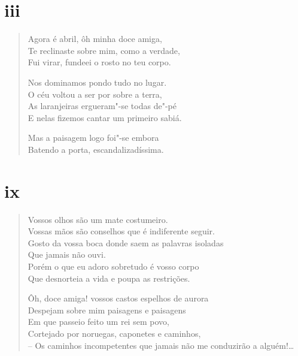 {%
\pagebreak
\section*{iii}

\begin{verse}
Agora é abril, ôh minha doce amiga,\\
Te reclinaste sobre mim, como a verdade,\\
Fui virar, fundeei o rosto no teu corpo.

Nos dominamos pondo tudo no lugar.\\
O céu voltou a ser por sobre a terra,\\
As laranjeiras ergueram"-se todas de"-pé\\
E nelas fizemos cantar um primeiro sabiá.

Mas a paisagem logo foi"-se embora\\
Batendo a porta, escandalizadíssima.
\end{verse}

\pagebreak
\section*{ix}

\begin{verse}
Vossos olhos são um mate costumeiro.\\
Vossas mãos são conselhos que é indiferente seguir.\\
Gosto da vossa boca donde saem as palavras isoladas\\
Que jamais não ouvi.\\
Porém o que eu adoro sobretudo é vosso corpo\\
Que desnorteia a vida e poupa as restrições.

Ôh, doce amiga! vossos castos espelhos de aurora\\
Despejam sobre mim paisagens e paisagens\\
Em que passeio feito um rei sem povo,\\
Cortejado por noruegas, caponetes e caminhos,\\
-- Os caminhos incompetentes que jamais não me conduzirão a alguém!\ldots{}\\
\end{verse}

}
